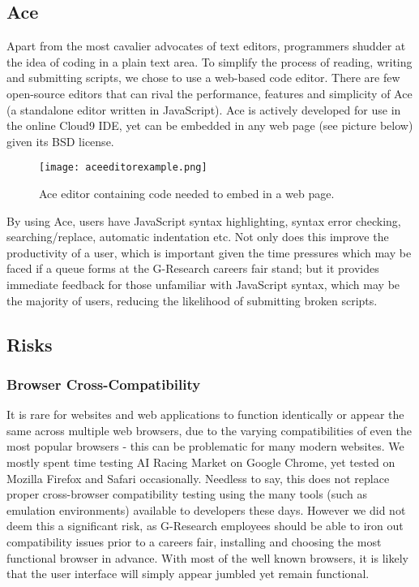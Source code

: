 \subsection{Ace}
Apart from the most cavalier advocates of text editors, programmers shudder at the idea of coding in a plain text area. To simplify the process of reading, writing and submitting scripts, we chose to use a web-based code editor. There are few open-source editors that can rival the performance, features and simplicity of Ace (a standalone editor written in JavaScript). Ace is actively developed for use in the online Cloud9 IDE, yet can be embedded in any web page (see picture below) given its BSD license.

\begin{figure}[H]
\centering
\texttt{[image: aceeditorexample.png]}
\caption{Ace editor containing code needed to embed in a web page.}
\end{figure}

\noindent By using Ace, users have JavaScript syntax highlighting, syntax error checking, searching/replace, automatic indentation etc. Not only does this improve the productivity of a user, which is important given the time pressures which may be faced if a queue forms at the G-Research careers fair stand; but it provides immediate feedback for those unfamiliar with JavaScript syntax, which may be the majority of users, reducing the likelihood of submitting broken scripts.

\subsection{Risks}

\subsubsection{Browser Cross-Compatibility}

It is rare for websites and web applications to function identically or appear the same across multiple web browsers, due to the varying compatibilities of even the most popular browsers - this can be problematic for many modern websites. We mostly spent time testing AI Racing Market on Google Chrome, yet tested on Mozilla Firefox and Safari occasionally. Needless to say, this does not replace proper cross-browser compatibility testing using the many tools (such as emulation environments) available to developers these days. However we did not deem this a significant risk, as G-Research employees should be able to iron out compatibility issues prior to a careers fair, installing and choosing the most functional browser in advance. With most of the well known browsers, it is likely that the user interface will simply appear jumbled yet remain functional.

